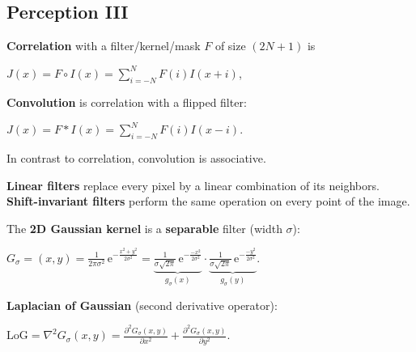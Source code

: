 \documentclass[landscape]{article}
\newcommand{\vmspace}{\vspace{-7pt}}
\newcommand{\vpspace}{\vspace{5pt}}
\newcommand{\vtspace}{\vspace{-10pt}}
\begin{document}
\begin{multicols}{3}
\vfill

\vtspace

\section{Perception III}

\vmspace

\begin{minipage}{\columnwidth}
  \textbf{Correlation} with a filter/kernel/mask $F$ of size $(2N+1)$ is
  \vmspace
  \begin{center}
    $J(x) = F \circ I(x) = \sum_{i=-N}^N F(i) I(x + i)$,
  \end{center}
\end{minipage}

\begin{minipage}{\columnwidth}
  \textbf{Convolution} is correlation with a flipped filter:
  \vmspace
  \begin{center}
    $J(x) = F \ast I(x) = \sum_{i=-N}^N F(i) I(x - i)$.
  \end{center}
  \vmspace
  In contrast to correlation, convolution is associative.
\end{minipage}

\vpspace

\begin{minipage}{\columnwidth}
  \textbf{Linear filters} replace every pixel by a linear combination of its
  neighbors. \textbf{Shift-invariant filters} perform the same operation on
  every point of the image.
\end{minipage}

\vpspace

\begin{minipage}{\columnwidth}
  The \textbf{2D Gaussian kernel} is a \textbf{separable} filter (width
  $\sigma$):
  \vmspace
  \begin{center}
    $
    G_\sigma = (x, y) = \frac{1}{2\pi\sigma^2}
    \,\mathrm e^{-\frac{x^2 + y^2}{2 \sigma ^2}}
    =
    \underbrace{\tfrac{1}{\sigma \sqrt{2\pi}}
    \,\mathrm e^{-\frac{-x^2}{2\sigma^2}}}_{g_\sigma(x)}
    \cdot
    \underbrace{\tfrac{1}{\sigma \sqrt{2\pi}}
    \,\mathrm e^{-\frac{-y^2}{2\sigma^2}}}_{g_\sigma(y)}.
    $
  \end{center}
\end{minipage}

\vpspace

\begin{minipage}{\columnwidth}
  \textbf{Laplacian of Gaussian} (second derivative operator):
  \vmspace
  \begin{center}
    $\mathrm{LoG} = \nabla^2 G_\sigma(x, y) = \frac{\partial^2 G_\sigma(x,
    y)}{\partial x^2} + \frac{\partial^2 G_\sigma(x, y)}{\partial y^2}.
    $
  \end{center}
\end{minipage}


\end{multicols}
\end{document}
